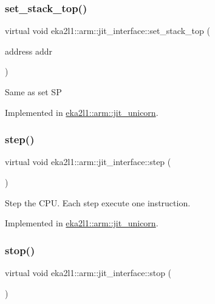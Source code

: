 \subsubsection{\texorpdfstring{set\+\_\+stack\+\_\+top()}{set\_stack\_top()}}
{\footnotesize\ttfamily virtual void eka2l1\+::arm\+::jit\+\_\+interface\+::set\+\_\+stack\+\_\+top (\begin{DoxyParamCaption}\item[{address}]{addr }\end{DoxyParamCaption})\hspace{0.3cm}{\ttfamily [pure virtual]}}

Same as set SP 

Implemented in \mbox{\hyperlink{classeka2l1_1_1arm_1_1jit__unicorn_a472a7da1849c941894cf684163fd0006}{eka2l1\+::arm\+::jit\+\_\+unicorn}}.

\mbox{\label{classeka2l1_1_1arm_1_1jit__interface_a424b0596eba2527407be4669d432f9b5}} 
\subsubsection{\texorpdfstring{step()}{step()}}
{\footnotesize\ttfamily virtual void eka2l1\+::arm\+::jit\+\_\+interface\+::step (\begin{DoxyParamCaption}{ }\end{DoxyParamCaption})\hspace{0.3cm}{\ttfamily [pure virtual]}}

Step the C\+PU. Each step execute one instruction. 

Implemented in \mbox{\hyperlink{classeka2l1_1_1arm_1_1jit__unicorn_a48ef5b1901b82dae466c340785997c92}{eka2l1\+::arm\+::jit\+\_\+unicorn}}.

\mbox{\label{classeka2l1_1_1arm_1_1jit__interface_a8454089a0370df8830884c07bc972755}} 
\subsubsection{\texorpdfstring{stop()}{stop()}}
{\footnotesize\ttfamily virtual void eka2l1\+::arm\+::jit\+\_\+interface\+::stop (\begin{DoxyParamCaption}{ }\end{DoxyParamCaption})\hspace{0.3cm}{\ttfamily [pure virtual]}}

